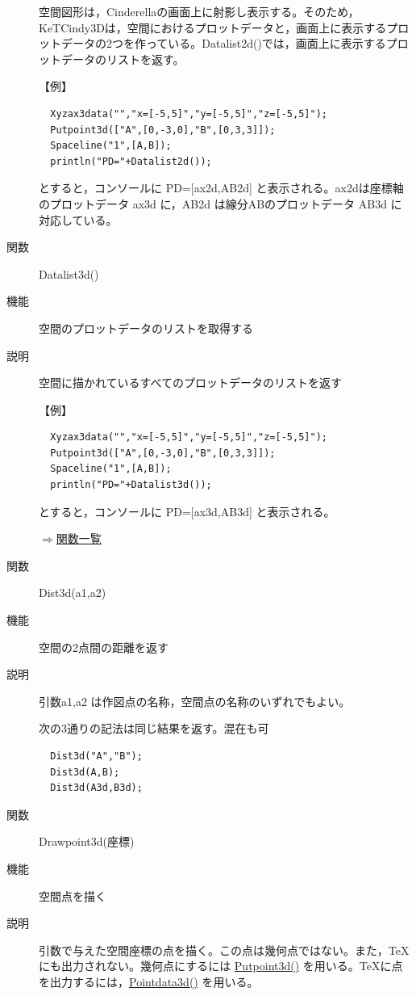 \documentclass[papersize,a4paper,12pt,uplatex]{jsarticle}
\begin{document}
\begin{description}
空間図形は，Cinderellaの画面上に射影し表示する。そのため，KeTCindy3Dは，空間におけるプロットデータと，画面上に表示するプロットデータの2つを作っている。Datalist2d()では，画面上に表示するプロットデータのリストを返す。

\vspace{\baselineskip}
【例】
\begin{verbatim}
  Xyzax3data("","x=[-5,5]","y=[-5,5]","z=[-5,5]");
  Putpoint3d(["A",[0,-3,0],"B",[0,3,3]]);
  Spaceline("1",[A,B]);
  println("PD="+Datalist2d());
\end{verbatim}
とすると，コンソールに  PD=[ax2d,AB2d]   と表示される。ax2dは座標軸のプロットデータ ax3d に，AB2d は線分ABのプロットデータ AB3d に対応している。

\vspace{\baselineskip}
\hypertarget{datalist}{}
\item[関数]  Datalist3d()
\item[機能]  空間のプロットデータのリストを取得する
\item[説明]  空間に描かれているすべてのプロットデータのリストを返す

\vspace{\baselineskip}
【例】
\begin{verbatim}
  Xyzax3data("","x=[-5,5]","y=[-5,5]","z=[-5,5]");
  Putpoint3d(["A",[0,-3,0],"B",[0,3,3]]);
  Spaceline("1",[A,B]);
  println("PD="+Datalist3d());
\end{verbatim}
とすると，コンソールに  PD=[ax3d,AB3d]   と表示される。


\begin{flushright} \hyperlink{functionlist}{$\Rightarrow$関数一覧}\end{flushright}

\hypertarget{dist3d}{}
\item[関数]  Dist3d(a1,a2)
\item[機能]  空間の2点間の距離を返す
\item[説明]  引数a1,a2 は作図点の名称，空間点の名称のいずれでもよい。

次の3通りの記法は同じ結果を返す。混在も可
\begin{verbatim}
  Dist3d("A","B");
  Dist3d(A,B);
  Dist3d(A3d,B3d);
\end{verbatim}
\vspace{\baselineskip}

\hypertarget{drawpoint3d}{}
\item[関数]  Drawpoint3d(座標)
\item[機能]  空間点を描く
\item[説明]  引数で与えた空間座標の点を描く。この点は幾何点ではない。また，TeX にも出力されない。幾何点にするには \hyperlink{putpoint3d}{Putpoint3d()} を用いる。TeXに点を出力するには，\hyperlink{pointdata3d}{Pointdata3d()} を用いる。


\end{description}
\end{document}
